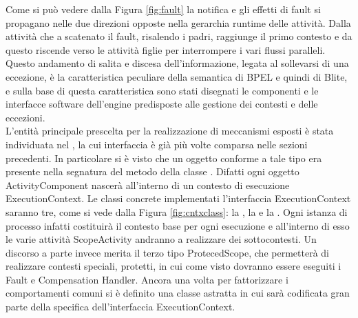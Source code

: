 Come si può vedere dalla Figura \ref{fig:fault} la notifica e gli effetti di
fault si propagano nelle due direzioni opposte nella gerarchia runtime delle
attività. Dalla attività che a scatenato il fault, risalendo i padri, raggiunge
il primo contesto e da questo riscende verso le attività figlie per
interrompere i vari flussi paralleli. Questo andamento di salita e discesa dell'informazione,
legata al sollevarsi di una eccezione, \`e la caratteristica peculiare della
semantica di BPEL e quindi di Blite, e sulla base di questa caratteristica sono
stati disegnati le componenti e le interfacce software dell'engine predisposte alle
gestione dei contesti e delle eccezioni.
\\

L'entità principale prescelta per la realizzazione di meccanismi esposti \`e
stata individuata nel , la cui interfaccia \`e già più
volte comparsa nelle sezioni precedenti. In particolare si \`e visto che un oggetto
conforme a tale tipo era presente nella segnatura del metodo
 della classe
. Difatti ogni oggetto ActivityComponent
nascerà all'interno di un contesto di esecuzione ExecutionContext.
Le classi concrete implementati l'interfaccia ExecutionContext saranno tre, come
si vede dalla Figura \ref{fig:cntxclass}: la ,
la  e la . Ogni istanza di
processo infatti costituirà il contesto base per ogni esecuzione e all'interno
di esso le varie attività ScopeActivity andranno a realizzare dei sottocontesti. Un discorso a
parte invece merita il terzo tipo ProtecedScope, che permetterà di realizzare
contesti speciali, protetti, in cui come visto dovranno essere eseguiti i Fault
e Compensation Handler. Ancora una volta per fattorizzare i comportamenti
comuni si \`e definito una classe astratta  in cui sarà
codificata gran parte della specifica dell'interfaccia ExecutionContext.

